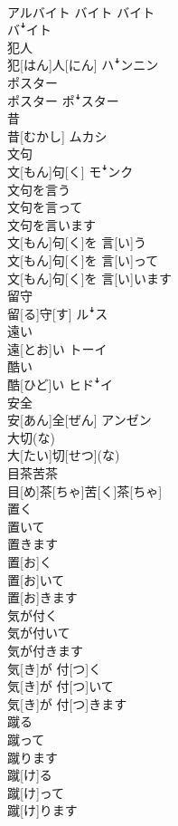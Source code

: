 \documentclass[8pt]{extreport}
\begin{document}
\begin{CJK}{UTF8}{min}
\\	アルバイト	バイト	バイト 
\\	バꜜイト
\\	犯人	
\\	犯[はん]人[にん]	ハꜜンニン
\\	ポスター	
\\	ポスター	ポꜜスター
\\	昔	
\\	昔[むかし]	ムカシ
\\	文句	
\\	文[もん]句[く]	モꜜンク
\\	文句を言う 
\\	文句を言って 
\\	文句を言います	
\\	文[もん]句[く]を 言[い]う 
\\	文[もん]句[く]を 言[い]って 
\\	文[もん]句[く]を 言[い]います	
\\	留守	
\\	留[る]守[す]	ルꜜス
\\	遠い	
\\	遠[とお]い	トーイ
\\	酷い	
\\	酷[ひど]い	ヒドꜜイ
\\	安全	
\\	安[あん]全[ぜん]	アンゼン
\\	大切(な)	
\\	大[たい]切[せつ](な)	
\\	目茶苦茶	
\\	目[め]茶[ちゃ]苦[く]茶[ちゃ]	
\\	置く 
\\	置いて 
\\	置きます	
\\	置[お]く 
\\	置[お]いて 
\\	置[お]きます	
\\	気が付く 
\\	気が付いて 
\\	気が付きます	
\\	気[き]が 付[つ]く 
\\	気[き]が 付[つ]いて 
\\	気[き]が 付[つ]きます	
\\	蹴る 
\\	蹴って 
\\	蹴ります	
\\	蹴[け]る 
\\	蹴[け]って 
\\	蹴[け]ります	

\end{CJK}
\end{document}
